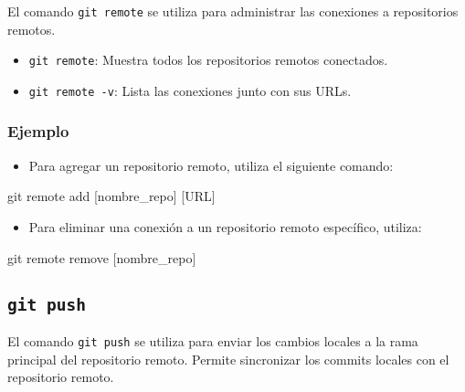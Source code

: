 \documentclass[
  a4paper,
]{article}
\newenvironment{Shaded}{}{}
\newcommand{\FunctionTok}[1]{\textcolor[rgb]{0.44,0.26,0.76}{#1}}
\newcommand{\NormalTok}[1]{\textcolor[rgb]{0.14,0.16,0.18}{#1}}
\newcommand{\PreprocessorTok}[1]{\textcolor[rgb]{0.84,0.23,0.29}{#1}}
\newcommand{\SpecialStringTok}[1]{\textcolor[rgb]{0.01,0.18,0.38}{#1}}
\providecommand{\tightlist}{%
  \setlength{\itemsep}{0pt}\setlength{\parskip}{0pt}}\usepackage{longtable,booktabs,array}
\begin{document}
El comando \texttt{git\ remote} se utiliza para administrar las
conexiones a repositorios remotos.

\begin{itemize}
\tightlist
\item
  \texttt{git\ remote}: Muestra todos los repositorios remotos
  conectados.
\item
  \texttt{git\ remote\ -v}: Lista las conexiones junto con sus URLs.
\end{itemize}

\subsubsection{Ejemplo}\label{ejemplo-2}

\begin{itemize}
\tightlist
\item
  Para agregar un repositorio remoto, utiliza el siguiente comando:
\end{itemize}

\begin{Shaded}
\begin{Highlighting}[]
\FunctionTok{git}\NormalTok{ remote add }\PreprocessorTok{[}\SpecialStringTok{nombre\_repo}\PreprocessorTok{]} \PreprocessorTok{[}\SpecialStringTok{URL}\PreprocessorTok{]}
\end{Highlighting}
\end{Shaded}

\begin{itemize}
\tightlist
\item
  Para eliminar una conexión a un repositorio remoto específico,
  utiliza:
\end{itemize}

\begin{Shaded}
\begin{Highlighting}[]
\FunctionTok{git}\NormalTok{ remote remove }\PreprocessorTok{[}\SpecialStringTok{nombre\_repo}\PreprocessorTok{]}
\end{Highlighting}
\end{Shaded}

\subsection{\texorpdfstring{\texttt{git\ push}}{git push}}\label{git-push}

El comando \texttt{git\ push} se utiliza para enviar los cambios locales
a la rama principal del repositorio remoto. Permite sincronizar los
commits locales con el repositorio remoto.
\end{document}
